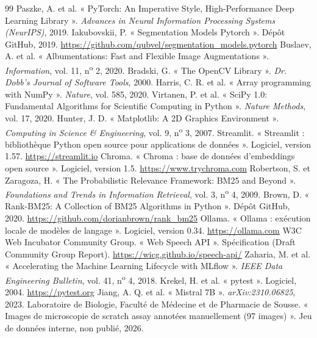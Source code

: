 \documentclass[12pt,a4paper]{report}
\begin{document}
\begin{thebibliography}{99}
 Paszke, A. et al. « PyTorch: An Imperative Style, High-Performance Deep Learning Library ». \textit{Advances in Neural Information Processing Systems (NeurIPS)}, 2019.
 Iakubovskii, P. « Segmentation Models Pytorch ». Dépôt GitHub, 2019. \url{https://github.com/qubvel/segmentation_models.pytorch}
 Buslaev, A. et al. « Albumentations: Fast and Flexible Image Augmentations ». \textit{Information}, vol. 11, n\textsuperscript{o} 2, 2020.
 Bradski, G. « The OpenCV Library ». \textit{Dr. Dobb's Journal of Software Tools}, 2000.
 Harris, C. R. et al. « Array programming with NumPy ». \textit{Nature}, vol. 585, 2020.
 Virtanen, P. et al. « SciPy 1.0: Fundamental Algorithms for Scientific Computing in Python ». \textit{Nature Methods}, vol. 17, 2020.
 Hunter, J. D. « Matplotlib: A 2D Graphics Environment ». \textit{Computing in Science \& Engineering}, vol. 9, n\textsuperscript{o} 3, 2007.
 Streamlit. « Streamlit : bibliothèque Python open source pour applications de données ». Logiciel, version 1.57. \url{https://streamlit.io}
 Chroma. « Chroma : base de données d'embeddings open source ». Logiciel, version 1.5. \url{https://www.trychroma.com}
 Robertson, S. et Zaragoza, H. « The Probabilistic Relevance Framework: BM25 and Beyond ». \textit{Foundations and Trends in Information Retrieval}, vol. 3, n\textsuperscript{o} 4, 2009.
 Brown, D. « Rank-BM25: A Collection of BM25 Algorithms in Python ». Dépôt GitHub, 2020. \url{https://github.com/dorianbrown/rank_bm25}
 Ollama. « Ollama : exécution locale de modèles de langage ». Logiciel, version 0.34. \url{https://ollama.com}
 W3C Web Incubator Community Group. « Web Speech API ». Spécification (Draft Community Group Report). \url{https://wicg.github.io/speech-api/}
 Zaharia, M. et al. « Accelerating the Machine Learning Lifecycle with MLflow ». \textit{IEEE Data Engineering Bulletin}, vol. 41, n\textsuperscript{o} 4, 2018.
 Krekel, H. et al. « pytest ». Logiciel, 2004. \url{https://pytest.org}
 Jiang, A. Q. et al. « Mistral 7B ». \textit{arXiv:2310.06825}, 2023.
 Laboratoire de Biologie, Faculté de Médecine et de Pharmacie de Sousse. « Images de microscopie de scratch assay annotées manuellement (97 images) ». Jeu de données interne, non publié, 2026.

\end{thebibliography}
\end{document}
